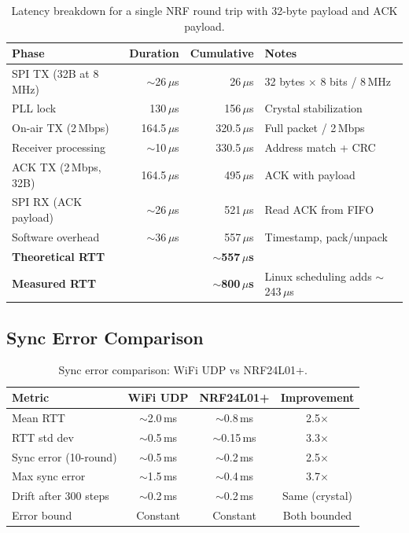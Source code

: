 \documentclass[11pt,a4paper]{article}
\begin{document}
\begin{table}[htbp]
\centering
\caption{Latency breakdown for a single NRF round trip with 32-byte payload and ACK payload.}
\begin{tabular}{l r r l}
\toprule
\textbf{Phase} & \textbf{Duration} & \textbf{Cumulative} & \textbf{Notes} \\
\midrule
SPI TX (32B at 8\,MHz) & ${\sim}$26\,$\mu$s & 26\,$\mu$s & 32 bytes $\times$ 8 bits / 8\,MHz \\
PLL lock & 130\,$\mu$s & 156\,$\mu$s & Crystal stabilization \\
On-air TX (2\,Mbps) & 164.5\,$\mu$s & 320.5\,$\mu$s & Full packet / 2\,Mbps \\
Receiver processing & ${\sim}$10\,$\mu$s & 330.5\,$\mu$s & Address match + CRC \\
ACK TX (2\,Mbps, 32B) & 164.5\,$\mu$s & 495\,$\mu$s & ACK with payload \\
SPI RX (ACK payload) & ${\sim}$26\,$\mu$s & 521\,$\mu$s & Read ACK from FIFO \\
Software overhead & ${\sim}$36\,$\mu$s & 557\,$\mu$s & Timestamp, pack/unpack \\
\midrule
\textbf{Theoretical RTT} & & \textbf{${\sim}$557\,$\mu$s} & \\
\textbf{Measured RTT} & & \textbf{${\sim}$800\,$\mu$s} & Linux scheduling adds ${\sim}$243\,$\mu$s \\
\bottomrule
\end{tabular}
\label{tab:latency}
\end{table}

\subsection{Sync Error Comparison}

\begin{table}[htbp]
\centering
\caption{Sync error comparison: WiFi UDP vs NRF24L01+.}
\begin{tabular}{l c c c}
\toprule
\textbf{Metric} & \textbf{WiFi UDP} & \textbf{NRF24L01+} & \textbf{Improvement} \\
\midrule
Mean RTT & ${\sim}$2.0\,ms & ${\sim}$0.8\,ms & 2.5$\times$ \\
RTT std dev & ${\sim}$0.5\,ms & ${\sim}$0.15\,ms & 3.3$\times$ \\
Sync error (10-round) & ${\sim}$0.5\,ms & ${\sim}$0.2\,ms & 2.5$\times$ \\
Max sync error & ${\sim}$1.5\,ms & ${\sim}$0.4\,ms & 3.7$\times$ \\
Drift after 300 steps & ${\sim}$0.2\,ms & ${\sim}$0.2\,ms & Same (crystal) \\
Error bound & Constant & Constant & Both bounded \\
\bottomrule
\end{tabular}
\label{tab:sync-comparison}
\end{table}
\end{document}
